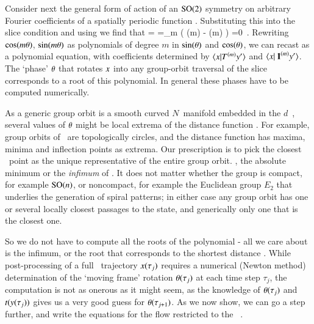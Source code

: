 Consider next the general form  of action of an
$\textrm{SO}(2)$ symmetry on arbitrary Fourier coefficients of a spatially
periodic function . Substituting this into the slice
condition  and using  we find that
\bea
{}
=
\continue
=\sum\limits_m
   \left(
     \cos(m\gSpace)
  -  \sin(m\gSpace)
   \right)
   =0
\,.
\label{eq:so2sing}
\eea
Rewriting $\cos(m{\bf \theta})$, $\sin(m{\bf \theta})$ as
polynomials of degree $m$ in $\sin({\bf \theta})$ and $\cos({\bf \theta})$, we can recast
 as a polynomial equation, with coefficients
determined by $\braket{\ssp}{\Lg^{(m)} \slicep}$ and
$\braket{\ssp}{\id^{(m)}\slicep}$. The `phase' ${\bf \theta}$ that rotates
$x$ into any group-orbit traversal of the slice corresponds to a root of
this polynomial. In general these phases have to be computed
numerically.

As a generic group orbit is a smooth curved $N$\dmn\ manifold embedded in
the $d$\dmn\ \statesp, several values of ${\bf \theta}$ might be local extrema
of the distance function . For example, group orbits of
\ are topologically circles, and the distance function
 has maxima, minima and inflection points as extrema.
Our prescription is to pick the closest \reducedsp\ point as the unique
representative of the entire group orbit. \ie, the absolute minimum or
the \emph{infimum} of . It does not matter whether
the group is compact, for example $\textrm{SO}(n)$, or noncompact, for example
the Euclidean group $E_2$ that underlies the generation of spiral
patterns; in either case any group orbit has one or several
locally closest passages to the {\template} state, and generically only
one that is the closest one.

So we do not have to compute all the roots of the polynomial
 - all we care about is the infimum, or the root that
corresponds to the shortest distance .
While post-processing of a full \statesp\ trajectory $x(\tau_j)$
requires a numerical (Newton method) determination of the
`moving frame' rotation
${\bf \theta}(\tau_j)$ at each time step $\tau_j$, the computation is not
as onerous as it might seem, as the knowledge of ${\bf \theta}(\tau_j)$ and
$t(y(\tau_j))$
gives us a very good guess for ${\bf \theta}(\tau_{j+1})$. As we now show, we
can go a step further, and write the equations for the flow restricted to
the \reducedsp\ \pSRed.

%
